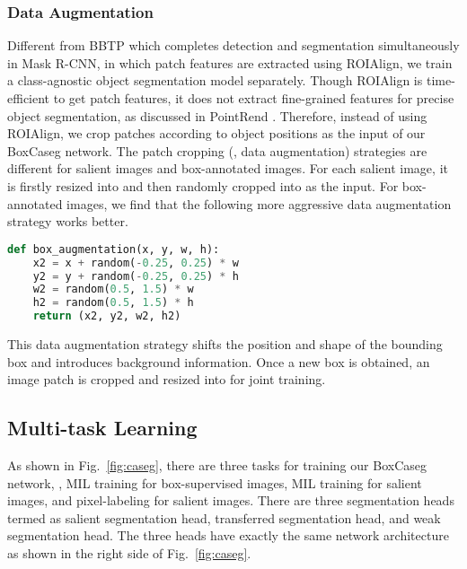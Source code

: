 \documentclass[final]{cvpr}
\begin{document}
\subsubsection{Data Augmentation}
\vspace{-2mm}
Different from BBTP which completes detection and segmentation simultaneously in Mask R-CNN, in which patch features are extracted using ROIAlign, we train a class-agnostic object segmentation model separately. Though ROIAlign is time-efficient to get patch features, it does not extract fine-grained features for precise object segmentation,  as discussed in PointRend \cite{kirillov2020pointrend}. Therefore, instead of using ROIAlign, we crop patches according to object positions as the input of our BoxCaseg network. The patch cropping (\ie, data augmentation) strategies are different for salient images and box-annotated images. For each salient image, it is firstly resized into  and then randomly cropped into  as the input. For box-annotated images, we find that the following more aggressive data augmentation strategy works better. 
\vspace{-1mm}
\begin{lstlisting}[language=Python]
def box_augmentation(x, y, w, h):
    x2 = x + random(-0.25, 0.25) * w
    y2 = y + random(-0.25, 0.25) * h
    w2 = random(0.5, 1.5) * w
    h2 = random(0.5, 1.5) * h
    return (x2, y2, w2, h2)
\end{lstlisting}    \vspace{-1mm}
This data augmentation strategy shifts the position and shape of the bounding box and introduces background information. Once a new box is obtained, an image patch is cropped and resized into  for joint training. 









\subsection{Multi-task Learning}
As shown in Fig.~\ref{fig:caseg}, there are three tasks for training our BoxCaseg network, \ie, MIL training for box-supervised images, MIL training for salient images, and pixel-labeling for salient images. There are three segmentation heads termed as salient segmentation head, transferred segmentation head, and weak segmentation head. The three heads have exactly the same network architecture as shown in the right side of Fig.~\ref{fig:caseg}.
\end{document}
